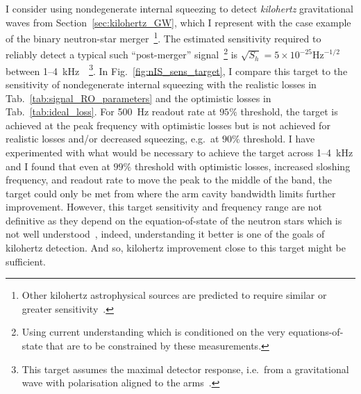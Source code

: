 I consider using nondegenerate internal squeezing to detect \emph{kilohertz} gravitational waves from Section~\ref{sec:kilohertz_GW}, which I represent with the case example of the binary neutron-star merger~\footnote{Other kilohertz astrophysical sources are predicted to require similar or greater sensitivity~\cite{}.}. The estimated sensitivity required to reliably detect a typical such ``post-merger'' signal~\footnote{Using current understanding which is conditioned on the very equations-of-state that are to be constrained by these measurements.} is $\sqrt{S_h}=5\times10^{-25} \mathrm{Hz}^{-1/2}$ between 1--4~kHz~\cite{miaoDesignGravitationalWaveDetectors2018}~\footnote{This target assumes the maximal detector response, i.e.\ from a gravitational wave with polarisation aligned to the arms~\cite{}.}.
In Fig.~\ref{fig:nIS_sens_target}, I compare this target to the sensitivity of nondegenerate internal squeezing with the realistic losses in Tab.~\ref{tab:signal_RO_parameters} and the optimistic losses in Tab.~\ref{tab:ideal_loss}. 
For 500~Hz readout rate at $95\%$ threshold, the target is achieved at the peak frequency with optimistic losses but is not achieved for realistic losses and/or decreased squeezing, e.g.\ at $90\%$ threshold. I have experimented with what would be necessary to achieve the target across 1--4~kHz and I found that even at $99\%$ threshold with optimistic losses, increased sloshing frequency, and readout rate to move the peak to the middle of the band, the target could only be met from where the arm cavity bandwidth limits further improvement. 
However, this target sensitivity and frequency range are not definitive as they depend on the equation-of-state of the neutron stars which is not well understood~\cite{}, indeed, understanding it better is one of the goals of kilohertz detection. And so, kilohertz improvement close to this target might be sufficient.
